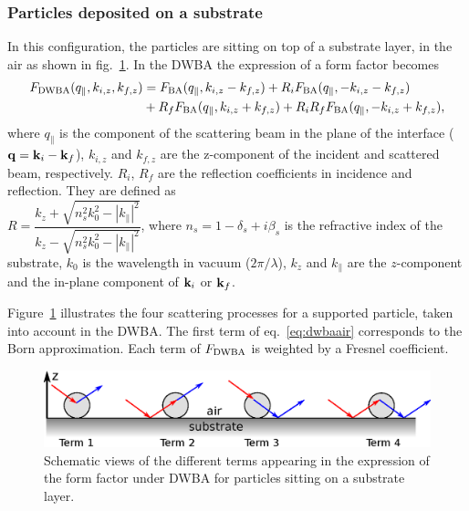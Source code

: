 \subsubsection{Particles deposited on a substrate}
In this configuration, the particles are sitting on top of a substrate layer, in the air as shown in fig.~\ref{fig:SchemDWBA}. In the DWBA the expression of a form factor becomes 
\begin{align}
F_{\rm{DWBA}}(q_{\parallel}, k_{i,z}, k_{f,z}) &= F_{\rm{BA}}(q_{\parallel}, k_{i,z}-k_{f,z})+ R_i F_{\rm{BA}}(q_{\parallel}, -k_{i,z}-k_{f,z}) \nonumber \\
&+ R_f F_{\rm{BA}}(q_{\parallel}, k_{i,z}+k_{f,z}) + R_i R_f F_{\rm{BA}}(q_{\parallel},-k_{i,z}+k_{f,z}), \label{eq:dwbaair}
\end{align}
where $q_{\parallel}$ is the component of the scattering beam in the plane of the interface ($\mathbf{q}=\mathbf{k}_i-\mathbf{k}_f$), $k_{i,z}$ and $k_{f,z}$ are the z-component of the incident and scattered beam, respectively. $R_i$, $R_f$ are the reflection coefficients in incidence and reflection. They are defined as\\ $R=\dfrac{k_z+\sqrt{n_s^2k_0^2-|k_{\parallel}|^2}}{k_z-\sqrt{n_s^2 k_0^2-|k_{\parallel}|^2}}$, where $n_s=1-\delta_s +i \beta_s$ is the refractive index of the substrate, $k_0$ is the wavelength in vacuum ($2\pi /\lambda$), $k_z$ and $k_{\parallel}$ are the $z$-component and the in-plane component of $\mathbf{k}_i$ or $\mathbf{k}_f$. \\


\vspace{18pt}

Figure~\ref{fig:SchemDWBA} illustrates the four scattering processes for a supported particle, taken into account in the DWBA. The first term of eq.~\ref{eq:dwbaair}  corresponds to the Born approximation. Each term of $F_{\rm{DWBA}}$ is weighted by a Fresnel coefficient. 

\begin{figure}[ht]
\begin{center}
\includegraphics[width=\textwidth]{Figures/drawing/drawingDWBA.eps}
\end{center}
\caption{Schematic views of the different terms appearing in the expression of the form factor under DWBA for particles sitting on a substrate layer.}
\label{fig:SchemDWBA}
\end{figure}


